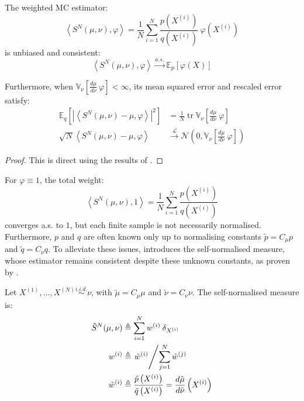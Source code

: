 \begin{proposition}\label{th:weighted_MC}
	The weighted MC estimator:
	\begin{equation}
		\left\langle S^N(\mu,\nu),\varphi\right\rangle=\frac{1}{N}\sum_{i=1}^N\frac{p\left(X^{(i)}\right)}{q\left(X^{(i)}\right)}\:\varphi\left(X^{(i)}\right)
	\end{equation}
	is unbiased and consistent:
	\begin{equation}
		\left\langle S^N(\mu,\nu),\varphi\right\rangle\overset{a.s.}{\longrightarrow}\mathbb{E}_p[\varphi(X)]
	\end{equation}

	Furthermore, when $\mathbb{V}_\nu\!\left[\frac{d\mu}{d\nu}\:\varphi\right]<\infty$, its mean squared error and rescaled error satisfy:
	\begin{align}
		\mathbb{E}_q\left[\left|\left\langle S^N(\mu,\nu)-\mu,\varphi\right\rangle\right|^2\right]&=\frac{1}{N}\operatorname{tr}\mathbb{V}_\nu\left[\frac{d\mu}{d\nu}\:\varphi\right]\\
		\sqrt{N}\left\langle S^N(\mu,\nu)-\mu,\varphi\right\rangle&\overset{\mathcal{L}}{\longrightarrow}\mathcal{N}\left(0,\mathbb{V}_\nu\left[\frac{d\mu}{d\nu}\:\varphi\right]\right)
	\end{align}
\end{proposition}

\begin{proof}
	This is direct using the results of .
\end{proof}

For $\varphi\equiv1$, the total weight:
\begin{equation}
	\left\langle S^N(\mu,\nu),1\right\rangle=\frac{1}{N}\sum_{i=1}^N\frac{p\left(X^{(i)}\right)}{q\left(X^{(i)}\right)}
\end{equation}
converges a.s. to $1$, but each finite sample is not necessarily normalised. Furthermore, $p$ and $q$ are often known only up to normalising constants $\tilde{p}=C_\mu p$ and $\tilde{q}=C_\nu q$. To alleviate these issues,  introduces the self-normalised measure, whose estimator remains consistent despite these unknown constants, as proven by .

\begin{definition}\label{th:self_normalised_measure}
	Let $X^{(1)}, \dots,X^{(N)}\overset{i.i.d.}{\sim}\nu$, with $\tilde{\mu}=C_\mu\mu$ and $\tilde{\nu}=C_\nu\nu$. The self-normalised measure is:
	\begin{align}
		\tilde{S}^N(\mu,\nu)&\triangleq\sum_{i=1}^Nw^{(i)}\:\delta_{X^{(i)}}\label{eq:self_normalised_estimator}\\
		w^{(i)}&\triangleq\left.\tilde{w}^{(i)}\middle/\sum_{j=1}^N\tilde{w}^{(j)}\right.\\
		\tilde{w}^{(i)}&\triangleq\frac{\tilde{p}\left(X^{(i)}\right)}{\tilde{q}\left(X^{(i)}\right)}=\frac{d\tilde{\mu}}{d\tilde{\nu}}\left(X^{(i)}\right)
	\end{align}
\end{definition}

